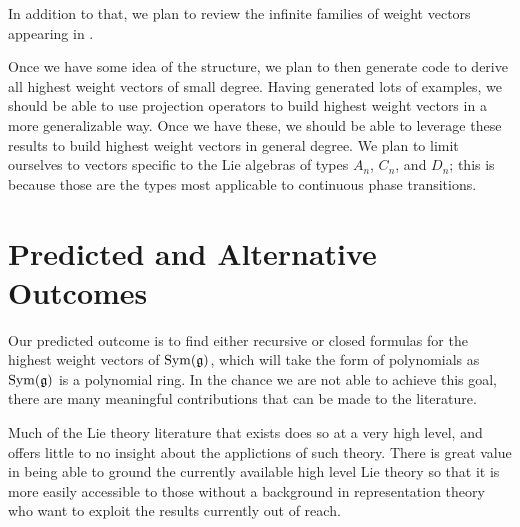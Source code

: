 \documentclass[11pt, reqno]{amsart}
\begin{document}
In addition to that, we plan to review the infinite families of weight vectors appearing in \cite{C20}. %

Once we have some idea of the structure, we plan to then generate code to derive all highest weight vectors of small degree. Having generated lots of examples, we should be able to use projection operators to build highest weight vectors in a more generalizable way. Once we have these, we should be able to leverage these results to build highest weight vectors in general degree. We plan to limit ourselves to vectors specific to the Lie algebras of types $A_{n}$, $C_{n}$, and $D_{n}$; this is because those are the types most applicable to continuous phase transitions.



\section{Predicted and Alternative Outcomes}

Our predicted outcome is to find either recursive or closed formulas for the highest weight vectors of $\operatorname{Sym}(\mathfrak{g})$, which will take the form of polynomials as $\operatorname{Sym}(\mathfrak{g})$ is a polynomial ring. In the chance we are not able to achieve this goal, there are many meaningful contributions that can be made to the literature.

Much of the Lie theory literature that exists does so at a very high level, and offers little to no insight about the applictions of such theory. There is great value in being able to ground the currently available high level Lie theory so that it is more easily accessible to those without a background in representation theory who want to exploit the results currently out of reach.
\end{document}

